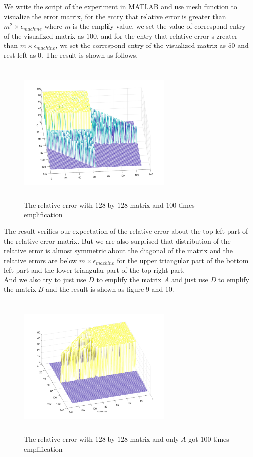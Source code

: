 \documentclass{article}
\begin{document}
We write the script of the experiment in MATLAB and use mesh function to visualize the error matrix, for the entry that relative error
is greater than $m^2 \times \epsilon_{machine}$ where $m$ is the emplify value, we set the value of correspond entry of the visualized matrix 
as $100$, and for the entry that relative error s greater than $m \times \epsilon_{machine}$, we set the correspond entry of the visualized 
matrix as $50$ and rest left as $0$. The result is shown as follows.\\
\begin{figure}[h]
    \centering
    \includegraphics[width=0.67\textwidth, height = 7cm]{128_100_2.png}
    \caption{The relative error with $128$ by $128$ matrix and $100$ times emplification}
\end{figure}

The result verifies our expectation of the relative error about the top left part of the relative error matrix. But we are also surprised that
distribution of the relative error is almost symmetric about the diagonal of the matrix and the relative errors are below $m \times \epsilon_{machine}$
for the upper triangular part of the bottom left part and the lower triangular part of the top right part.\\

And we also try to just use $D$ to emplify the matrix $A$ and just use $D$ to emplify the matrix $B$ and the result is shown as figure 9 and 10.\\
\begin{figure}[h]
    \centering
    \includegraphics[width=0.67\textwidth, height = 7cm]{128_100_2_A.png}
    \caption{The relative error with $128$ by $128$ matrix and only $A$ got $100$ times emplification}
\end{figure}
\end{document}
